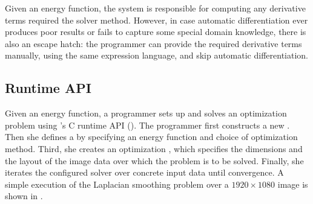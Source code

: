 Given an energy function, the system is responsible for computing any derivative terms required the solver method.
However, in case automatic differentiation ever produces poor results or fails to capture some special domain knowledge, there is also an escape hatch: the programmer can provide the required derivative terms manually, using the same expression language, and skip automatic differentiation.


\subsection{Runtime API} %
\label{sec:runtime_api}

Given an energy function, a programmer sets up and solves an optimization problem using \OPT's C runtime API ().
The programmer first constructs a new .
Then she defines a  by specifying an energy function and choice of optimization method.
Third, she creates an optimization , which specifies the dimensions and the layout of the image data over which the problem is to be solved.
Finally, she iterates the configured solver over concrete input data until convergence.
A simple execution of the Laplacian smoothing problem over a $1920\times 1080$ image is shown in .

